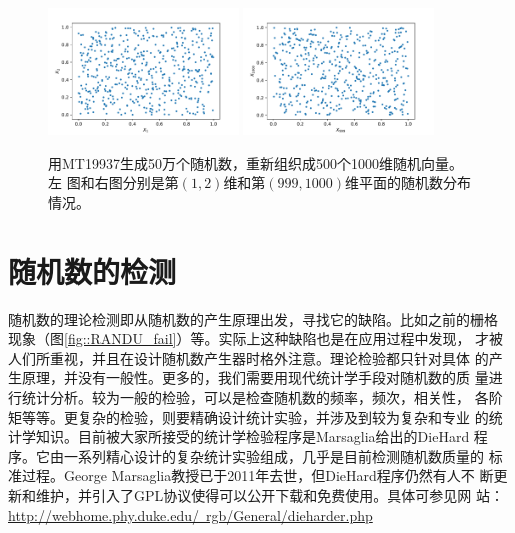\begin{figure}[!ht]
\centering
\includegraphics[width=0.45\textwidth]{images/MT19937_X1X2.pdf}
\includegraphics[width=0.45\textwidth]{images/MT19937_X999X1000.pdf}
\caption{用MT19937生成50万个随机数，重新组织成500个1000维随机向量。左
  图和右图分别是第$(1, 2)$维和第$(999, 1000)$维平面的随机数分布情况。}
\label{fig::MT19937_1000D}
\end{figure}

\section{随机数的检测}

随机数的理论检测即从随机数的产生原理出发，寻找它的缺陷。比如之前的栅格
现象（图\ref{fig::RANDU_fail}）等。实际上这种缺陷也是在应用过程中发现，
才被人们所重视，并且在设计随机数产生器时格外注意。理论检验都只针对具体
的产生原理，并没有一般性。更多的，我们需要用现代统计学手段对随机数的质
量进行统计分析。较为一般的检验，可以是检查随机数的频率，频次，相关性，
各阶矩等等。更复杂的检验，则要精确设计统计实验，并涉及到较为复杂和专业
的统计学知识。目前被大家所接受的统计学检验程序是Marsaglia给出的DieHard
程序。它由一系列精心设计的复杂统计实验组成，几乎是目前检测随机数质量的
标准过程。George Marsaglia教授已于2011年去世，但DieHard程序仍然有人不
断更新和维护，并引入了GPL协议使得可以公开下载和免费使用。具体可参见网
站：\\
\href{http://webhome.phy.duke.edu/\~rgb/General/dieharder.php}
     {http://webhome.phy.duke.edu/~rgb/General/dieharder.php}
     \\

     
